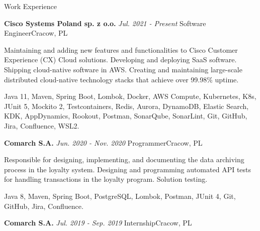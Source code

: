 \documentclass{resume}
\begin{document}

\begin{rSection}{Work Experience}

\begin{rSubsection}
    {\bf Cisco Systems Poland sp. z o.o.}
    {\em Jul. 2021 - Present}
    {\normalfont Software Engineer}{Cracow, PL}

    \item[] {Maintaining and adding new features and functionalities to Cisco Customer Experience (CX) Cloud solutions.
    Developing and deploying SaaS software. Shipping cloud-native software in AWS.
    Creating and maintaining large-scale distributed cloud-native technology stacks that achieve over 99.98\% uptime.}
    \item[] {Java 11, Maven, Spring Boot, Lombok, Docker, AWS Compute, Kubernetes, K8s, JUnit 5, Mockito 2, Testcontainers, Redis, Aurora, DynamoDB,
    Elastic Search, KDK, AppDynamics, Rookout, Postman, SonarQube, SonarLint, Git, GitHub, Jira, Confluence, WSL2.}

\end{rSubsection}

\begin{rSubsection}
    {\bf Comarch S.A.}
    {\em Jun. 2020 - Nov. 2020}
    {\normalfont Programmer}{Cracow, PL}

    \item[] {Responsible for designing, implementing, and documenting the data archiving process in the loyalty system. Designing and programming
    automated API tests for handling transactions in the loyalty program. Solution testing.}
    \item[] {Java 8, Maven, Spring Boot, PostgreSQL, Lombok, Postman, JUnit 4, Git, GitHub, Jira, Confluence.}

\end{rSubsection}

\begin{rSubsection}
    {\bf Comarch S.A.}
    {\em Jul. 2019 - Sep. 2019}
    {\normalfont Internship}{Cracow, PL}


\end{rSubsection}
\end{rSection}
\end{document}
